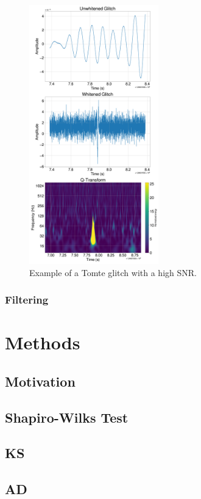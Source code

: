 \documentclass[12pt]{article}
\begin{document}
\begin{figure}[H]
  \centering
  \includegraphics[width=0.5\textwidth]{images/sample_plot.pdf}
  \caption{Example of a Tomte glitch with a high SNR.}
  \label{fig:sampletomte}
\end{figure}

\subsubsection{Filtering}

\section{Methods}\label{Methods}
\subsection{Motivation}
\subsection{Shapiro-Wilks Test}
\subsection{KS}
\subsection{AD}
\end{document}
